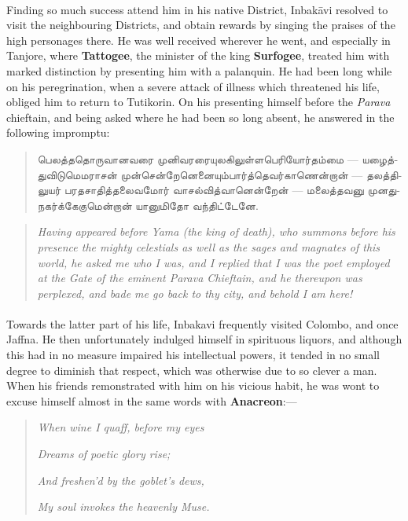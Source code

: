 \documentclass{article}
\newcommand{\TamilText}[1]{\texttamil{#1}}
\newcommand{\tam}[1]{\TamilText{#1}}
\begin{document}
\paragraph{}
Finding so much success attend him in his native District, Inbak\={a}vi resolved to visit the neighbouring Districts, and obtain rewards by singing the praises of the high personages there. He was well received wherever he went, and especially in Tanjore, where \textbf{Tattogee}, the minister of the king \textbf{Surfogee}, treated him with marked distinction by presenting him with a palanquin. He had been long while on his peregrination, when a severe attack of illness which threatened his life, obliged him to return to Tutikorin. On his presenting himself before the \emph{Parava} chieftain, and being asked where he had been so long absent, he answered in the following impromptu: 
\begin{quotation}\small
\tam{பெலத்ததொருவானவரை முனிவரரையுலகிலுள்ளபெரியோர்தம்‌மை} --- \tam{யழைத்துவிடுமெமராசன்‌ முன்சென்றேனெனையும்பார்த்தெவர்காணென்றான்‌} --- \tam{தலத்திலுயர்‌ பரதசாதித்தலைவமோர்‌ வாசல்வித்வானென்றேன்‌} --- \tam{மலைத்தவனு முனதுநகர்க்கேகுமென்றான்‌ யானுமிதோ வந்திட்டேனே}.
\end{quotation}
\begin{quotation}\small
\emph{Having appeared before Yama (the king of death), who summons before his presence the mighty celestials as well as the sages and magnates of this world, he asked me who I was, and I replied that I was the poet employed at the Gate of the eminent Parava Chieftain, and he thereupon was perplexed, and bade me go back to thy city, and behold I am here!}
\end{quotation}
\paragraph{}
Towards the latter part of his life, Inbakavi frequently visited Colombo, and once Jaffna. He then unfortunately indulged himself in spirituous liquors, and although this had in no measure impaired his intellectual powers, it tended in no small degree to diminish that respect, which was otherwise due to so clever a man. When his friends remonstrated with him on his vicious habit, he was wont to excuse himself almost in the same words with \textbf{Anacreon}:---
\begin{quotation}\small
\emph{When wine I quaff, before my eyes}

\emph{Dreams of poetic glory rise;}

\emph{And freshen'd by the goblet's dews,}

\emph{My soul invokes the heavenly Muse.}
\end{quotation}
\end{document}
